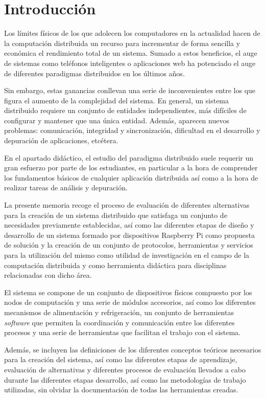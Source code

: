 \chapter{Introducción}

Los límites físicos de los que adolecen los computadores en la actualidad\cite{seth:physical} hacen de la computación distribuida un recurso para incrementar de forma sencilla y económica el rendimiento total de un sistema. Sumado a estos beneficios, el auge de sistemas como teléfonos inteligentes o aplicaciones web ha potenciado el auge de diferentes paradigmas distribuidos en los últimos años.

Sin embargo, estas ganancias conllevan una serie de inconvenientes entre los que figura el aumento de la complejidad del sistema. En general, un sistema distribuido requiere un conjunto de entidades independientes, más difíciles de configurar y mantener que una única entidad. Además, aparecen nuevos problemas: comunicación, integridad y sincronización, dificultad en el desarrollo y depuración de aplicaciones, etcétera.

En el apartado didáctico, el estudio del paradigma distribuido suele requerir un gran esfuerzo por parte de los estudiantes, en particular a la hora de comprender los fundamentos básicos de cualquier aplicación distribuida así como a la hora de realizar tareas de análisis y depuración.

La presente memoria recoge el proceso de evaluación de diferentes alternativas para la creación de un sistema distribuido que satisfaga un conjunto de necesidades previamente establecidas, así como las diferentes etapas de diseño y desarrollo de un sistema formado por dispositivos Raspberry Pi como propuesta de solución y la creación de un conjunto de protocolos, herramientas y servicios para la utilización del mismo como utilidad de investigación en el campo de la computación distribuida y como herramienta didáctica para disciplinas relacionadas con dicho área.

El sistema se compone de un conjunto de dispositivos físicos compuesto por los nodos de computación y una serie de módulos accesorios, así como los diferentes mecanismos de alimentación y refrigeración, un conjunto de herramientas \textit{software} que permiten la coordinación y comunicación entre los diferentes procesos y una serie de herramientas que facilitan el trabajo con el sistema.

Además, se incluyen las definiciones de los diferentes conceptos teóricos necesarios para la creación del sistema, así como las diferentes etapas de aprendizaje, evaluación de alternativas y diferentes procesos de evaluación llevados a cabo durante las diferentes etapas desarrollo, así como las metodologías de trabajo utilizadas, sin olvidar la documentación de todas las herramientas creadas.